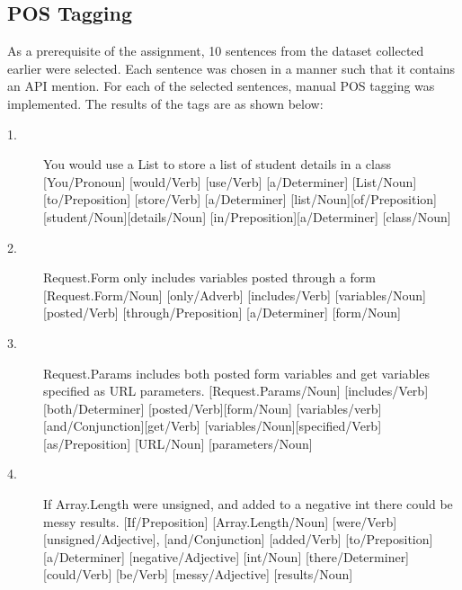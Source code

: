 \documentclass{sig-alternate-05-2015}
\begin{document}
\subsection{POS Tagging}

As a prerequisite of the assignment, 10 sentences from the dataset collected earlier were selected. Each sentence was chosen in a manner such that it contains an API mention. For each of the selected sentences, manual POS tagging was implemented. The results of the tags are as shown below: 

\begin{description}
\item[1.]
You would use a List to store a list of student details in a class \linebreak
{[You/Pronoun]} [would/Verb] [use/Verb] [a/Determiner] \linebreak
{[List/Noun]}{[to/Preposition]} [store/Verb] [a/Determiner] \linebreak
{[list/Noun]}{[of/Preposition]}[student/Noun][details/Noun] \linebreak
{[in/Preposition]}{[a/Determiner]} [class/Noun]

\item[2.]
Request.Form only includes variables posted through a form \linebreak
{[Request.Form/Noun]} [only/Adverb] [includes/Verb] \linebreak
{[variables/Noun]}[posted/Verb] [through/Preposition] \linebreak
{[a/Determiner]} [form/Noun]

\item[3.]
Request.Params includes both posted form variables and get variables specified as URL parameters. \linebreak
{[Request.Params/Noun]} [includes/Verb] \linebreak
{[both/Determiner]} {[posted/Verb]}[form/Noun] \linebreak
{[variables/verb]} [and/Conjunction]{[get/Verb]} \linebreak
{[variables/Noun]}[specified/Verb] [as/Preposition]\linebreak
{[URL/Noun]} [parameters/Noun]

\item[4.]
If Array.Length were unsigned, and added to a negative int there could be messy results. \linebreak
{[If/Preposition]} [Array.Length/Noun] [were/Verb] \linebreak
{[unsigned/Adjective]}, {[and/Conjunction]} [added/Verb] \linebreak
{[to/Preposition]} {[a/Determiner]} [negative/Adjective] \linebreak
{[int/Noun]} [there/Determiner] [could/Verb] [be/Verb] \linebreak
{[messy/Adjective]} [results/Noun]


\end{description}
\end{document}
